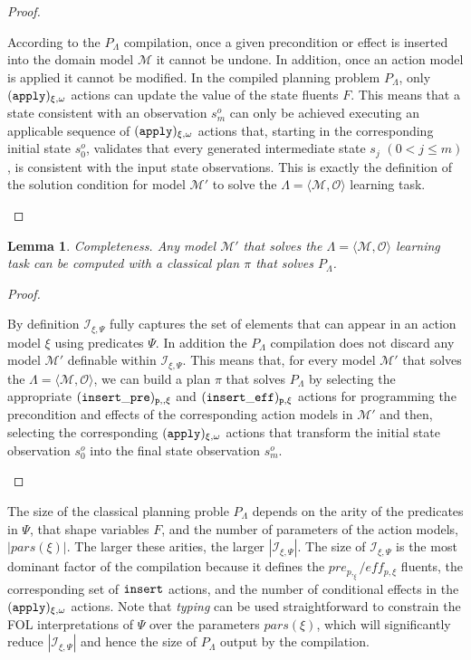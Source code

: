 \documentclass[runningheads]{llncs}
\newcommand{\tup}[1]{{\langle #1 \rangle}}
\newtheorem{mylemma}[mytheorem]{Lemma}
\begin{document}
\begin{proof}[Proof]
\begin{small}
According to the $P_{\Lambda}$ compilation, once a given precondition or effect is inserted into the domain model $\mathcal{M}$ it cannot be undone. In addition, once an action model is applied it cannot be modified. In the compiled planning problem $P_{\Lambda}$, only ${\tt \small (apply)_{\xi,\omega}}$ actions can update the value of the state fluents $F$. This means that a state consistent with an observation $s_m^o$ can only be achieved executing an applicable sequence of ${\tt \small (apply)_{\xi,\omega}}$ actions that, starting in the corresponding initial state $s_0^o$, validates that every generated intermediate state $s_j$ $(0 < j\leq m)$, is consistent with the input state observations. This is exactly the definition of the solution condition for model $\mathcal{M}'$ to solve the $\Lambda=\tup{\mathcal{M},{\mathcal O}}$ learning task.
\end{small}
\end{proof}

\begin{mylemma}
Completeness. Any model $\mathcal{M}'$ that solves the $\Lambda=\tup{\mathcal{M},{\mathcal O}}$ learning task can be computed with a classical plan $\pi$ that solves $P_{\Lambda}$.
\end{mylemma}

\begin{proof}[Proof]
\begin{small}
By definition ${\mathcal I}_{\xi,\Psi}$ fully captures the set of elements that can appear in an action model $\xi$ using predicates $\Psi$. In addition the $P_{\Lambda}$ compilation does not discard any model $\mathcal{M}'$ definable within ${\mathcal I}_{\xi,\Psi}$. This means that, for every model $\mathcal{M}'$ that solves the $\Lambda=\tup{\mathcal{M},{\mathcal O}}$, we can build a plan $\pi$ that solves $P_{\Lambda}$ by selecting the appropriate ${\tt \small (insert\_pre)_{p,,\xi}}$ and ${\tt \small (insert\_eff)_{p,\xi}}$ actions for programming the precondition and effects of the corresponding action models in $\mathcal{M}'$ and then, selecting the corresponding ${\tt\small (apply)_{\xi,\omega}}$ actions that transform the initial state observation $s_0^o$ into the final state observation $s_m^o$.
\end{small}
\end{proof}

The size of the classical planning proble $P_{\Lambda}$ depends on the arity of the predicates in $\Psi$, that shape variables $F$, and the number of parameters of the action models, $|pars(\xi)|$. The larger these arities, the larger $|{\mathcal I}_{\xi,\Psi}|$. The size of ${\mathcal I}_{\xi,\Psi}$ is the most dominant factor of the compilation because it defines the $pre_{p,_\xi}/eff_{p,\xi}$ fluents, the corresponding set of ${\tt\small insert}$ actions, and the number of conditional effects in the ${\tt\small (apply)_{\xi,\omega}}$ actions. Note that {\em typing} can be used straightforward to constrain the FOL interpretations of $\Psi$ over the parameters $pars(\xi)$, which will significantly reduce $|{\mathcal I}_{\xi,\Psi}|$ and hence the size of $P_{\Lambda}$ output by the compilation.
\end{document}
